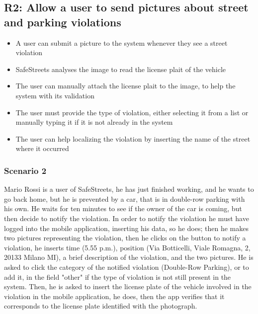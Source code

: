 \subsection{R2: Allow a user to send pictures about street and parking violations}
\begin{itemize}
    \item A user can submit a picture to the system whenever they see a street violation
    \item SafeStreets analyses the image to read the license plait of the vehicle
    \item The user can manually attach the license plait to the image, to help the system with its validation
    \item The user must provide the type of violation, either selecting it from a list or manually typing it if it is not already in the system
    \item The user can help localizing the violation by inserting the name of the street where it occurred
\end{itemize}
\subsubsection{Scenario 2}
Mario Rossi is a user of SafeStreets, he has just finished working, and he wants to go back home, but he is prevented by a car, that is in double-row parking with his own. He waits for ten 
minutes to see if the owner of the car is coming, but then decide to notify the violation. In order to notify the violation he must have logged into the mobile application, inserting his data, so he does; then he makes two pictures representing the violation, 
then he clicks on the button to notify a violation, he inserts time (5.55 p.m.), position (Via Botticelli, Viale Romagna, 2, 20133 Milano MI), a brief description 
of the violation, and the two pictures. He is asked to click the category of the notified violation (Double-Row Parking), or to add it, in the field "other" if the type of violation is not still 
present in the system. Then, he is asked to insert the license plate of the vehicle involved in the violation in the mobile application, he does, then the app verifies that it 
corresponds to the license plate identified with the photograph.

